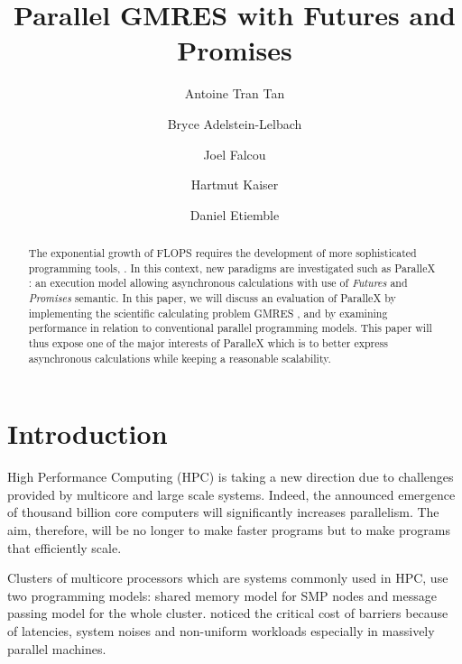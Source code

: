 \documentclass{llncs}
\begin{document}
\title{Parallel GMRES with Futures and Promises}

\author{Antoine Tran Tan \and Bryce Adelstein-Lelbach \and Joel Falcou \and Hartmut Kaiser \and
Daniel Etiemble }

\maketitle

\begin{abstract}
The exponential growth of FLOPS requires the development of more sophisticated
programming tools, . In this context, new paradigms are
investigated such as ParalleX \cite{ParalleX}: an execution model allowing
asynchronous calculations with use of \emph{Futures} and \emph{Promises}
semantic. In this paper, we will discuss an evaluation of ParalleX by
implementing the scientific calculating problem GMRES \cite{GMRES}, and by
examining performance in relation to conventional parallel programming models.
This paper will thus expose one of the major interests of ParalleX which is to
better express asynchronous calculations while keeping a reasonable
scalability. 
\end{abstract}


\section{Introduction}\label{Introduction}
High Performance Computing (HPC) is taking a new direction due to challenges
provided by multicore and large scale systems. Indeed, the announced emergence
of thousand billion core computers will significantly increases parallelism.
The aim, therefore, will be no longer to make faster programs but to make
programs that efficiently scale.\smallskip 

Clusters of multicore processors which are systems commonly used in HPC, use
two programming models: shared memory model for SMP nodes and message passing
model for the whole cluster.  noticed the critical cost of barriers because
of latencies, system noises and non-uniform workloads especially in massively
parallel machines.\smallskip 
\end{document}
